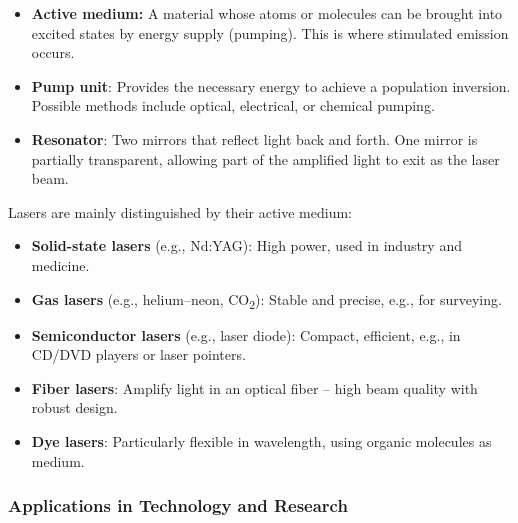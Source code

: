 \begin{itemize}
	\item \textbf{Active medium:} A material whose atoms or molecules can be brought into excited states by energy supply (pumping). This is where stimulated emission occurs.
	\item \textbf{Pump unit}: Provides the necessary energy to achieve a population inversion. Possible methods include optical, electrical, or chemical pumping.
	\item \textbf{Resonator}: Two mirrors that reflect light back and forth. One mirror is partially transparent, allowing part of the amplified light to exit as the laser beam.
\end{itemize}
\newpage
\noindent
\begin{tcolorbox}[didaktikbox, title={Variety of Laser Types – An Overview}]
	\label{box:Typenvielfalt von Lasern}
	Lasers are mainly distinguished by their active medium:
	\begin{itemize}
		\item \textbf{Solid-state lasers} (e.g., Nd:YAG): High power, used in industry and medicine.
		\item \textbf{Gas lasers} (e.g., helium–neon, CO\textsubscript{2}): Stable and precise, e.g., for surveying.
		\item \textbf{Semiconductor lasers} (e.g., laser diode): Compact, efficient, e.g., in CD/DVD players or laser pointers.
		\item \textbf{Fiber lasers}: Amplify light in an optical fiber – high beam quality with robust design.
		\item \textbf{Dye lasers}: Particularly flexible in wavelength, using organic molecules as medium.
	\end{itemize}
\end{tcolorbox}

\subsubsection{Applications in Technology and Research}

